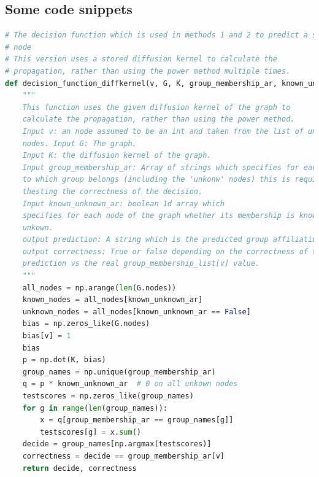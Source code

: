 \subsection{Some code snippets}
\begin{lstlisting}[language=python]
# The decision function which is used in methods 1 and 2 to predict a single
# node
# This version uses a stored diffusion kernel to calculate the
# propagation, rather than using the power method multiple times.
def decision_function_diffkernel(v, G, K, group_membership_ar, known_unknown_ar):
    """
    This function uses the given diffusion kernel of the graph to
    calculate the propagation, rather than using the power method.
    Input v: an node assumed to be an int and taken from the list of unkown
    nodes. Input G: The graph.
    Input K: the diffusion kernel of the graph.
    Input group_membership_ar: Array of strings which specifies for each node
    to which group belongs (including the 'unkonw' nodes) this is required for
    thesting the correctness of the decision.
    Input known_unknown_ar: boolean 1d array which
    specifies for each node of the graph whether its membership is known or
    unkown.
    output prediction: A string which is the predicted group affiliation.
    output correctness: True or false depending on the correctness of the
    prediction vs the real group_membership_list[v] value.
    """
    all_nodes = np.arange(len(G.nodes))
    known_nodes = all_nodes[known_unknown_ar]
    unknown_nodes = all_nodes[known_unknown_ar == False]
    bias = np.zeros_like(G.nodes)
    bias[v] = 1
    bias
    p = np.dot(K, bias)
    group_names = np.unique(group_membership_ar)
    q = p * known_unknown_ar  # 0 on all unkown nodes
    testscores = np.zeros_like(group_names)
    for g in range(len(group_names)):
        x = q[group_membership_ar == group_names[g]]
        testscores[g] = x.sum()
    decide = group_names[np.argmax(testscores)]
    correctness = decide == group_membership_ar[v]
    return decide, correctness


\end{lstlisting}
